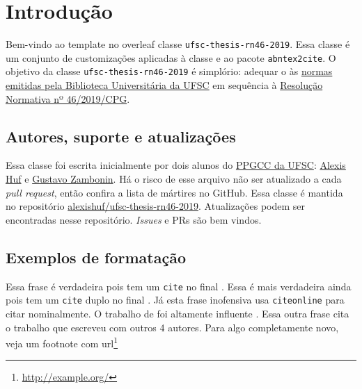 \chapter{Introdução}
    \label{ch:intro}
    
    Bem-vindo ao template no overleaf classe \texttt{ufsc-thesis-rn46-2019}. Essa
    classe é um conjunto de customizações aplicadas à classe
    \href{https://ctan.org/pkg/abntex2}{\abnTeX} e ao pacote \texttt{abntex2cite}.
    O objetivo da classe \texttt{ufsc-thesis-rn46-2019} é simplório: adequar o
    \abnTeX{} às \href{http://portal.bu.ufsc.br/normalizacao/}{normas emitidas pela
    Biblioteca Universitária da UFSC} em sequência à
    \href{https://repositorio.ufsc.br/handle/123456789/197121}{Resolução Normativa
    nº 46/2019/CPG}.
    
    
    \section{Autores, suporte e atualizações}
    
    Essa classe foi escrita inicialmente por dois alunos do
    \href{http://ppgcc.posgrad.ufsc.br/}{PPGCC da UFSC}:
    \href{mailto:alexishuf@gmail.com}{Alexis Huf} e
    \href{mailto:gustavo.zambonin@posgrad.ufsc.br}{Gustavo Zambonin}.  
    Há o risco de esse arquivo não ser atualizado a cada \textit{pull request},
    então confira a lista de mártires no GitHub. Essa classe é mantida no
    repositório
    \href{https://github.com/alexishuf/ufsc-thesis-rn46-2019/}{alexishuf/ufsc-thesis-rn46-2019}.
    Atualizações podem ser encontradas nesse repositório. \textit{Issues} e PRs são
    bem vindos.
    
    \section{Exemplos de formatação}
    \label{sec:ex}
    
    Essa frase é verdadeira pois tem um \texttt{cite} no final \cite{turing1937}. Essa
    é mais verdadeira ainda pois tem um  \texttt{cite} duplo no
    final \cite{turing1937,dijkstra1968}. Já esta frase inofensiva usa
     \texttt{citeonline} para citar 
    nominalmente. O trabalho de  foi altamente influente
    \cite{diffie1976}. Essa outra frase cita o trabalho que 
    escreveu com outros 4 autores. Para algo completamente novo, veja um footnote
    com url\footnote{\url{http://example.org/}}
    
